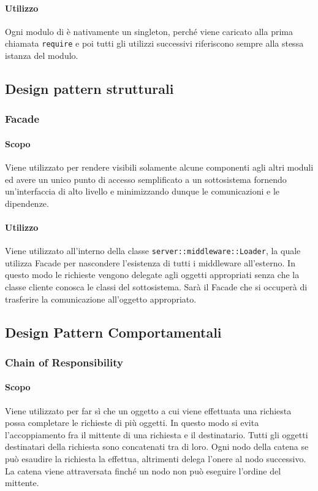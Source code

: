 \documentclass[12pt,a4paper]{article}
\begin{document}
\paragraph{Utilizzo}
Ogni modulo di  è nativamente un singleton, perché viene caricato alla prima chiamata \texttt{require} e poi tutti gli utilizzi successivi riferiscono sempre alla stessa istanza del modulo.

\subsection{Design pattern strutturali}

\subsubsection{Facade}
\paragraph{Scopo}
Viene utilizzato per rendere visibili solamente alcune componenti agli altri moduli ed avere un unico punto di accesso semplificato a un sottosistema fornendo un’interfaccia di alto livello e minimizzando dunque le comunicazioni e le dipendenze.

\paragraph{Utilizzo}
Viene utilizzato all’interno della classe \texttt{server::middleware::Loader}, la quale utilizza Facade per nascondere l’esistenza di tutti i middleware all'esterno. In questo modo le richieste vengono delegate agli oggetti appropriati senza che la classe cliente conosca le classi del sottosistema. Sarà il Facade che si occuperà di trasferire la comunicazione all’oggetto appropriato.

\subsection{Design Pattern Comportamentali}
\subsubsection{Chain of Responsibility}

\paragraph{Scopo}
Viene utilizzato per far sì che un oggetto a cui viene effettuata una richiesta possa completare le richieste di più oggetti. In questo modo si evita l’accoppiamento fra il mittente di una richiesta e il destinatario. Tutti gli oggetti destinatari della richiesta sono concatenati tra di loro. Ogni nodo della catena se può esaudire la richiesta la effettua, altrimenti delega l’onere al nodo successivo. La catena viene attraversata finché un nodo non può eseguire l’ordine del mittente.
\end{document}
